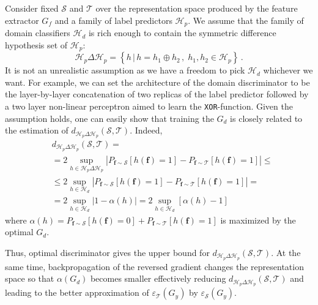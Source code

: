 Consider fixed $ \mathcal{S} $ and $ \mathcal{T} $ over the representation space produced by the feature extractor $ G_f $ and a family of label predictors $ \mathcal{H}_p $. We assume that the family of domain classifiers $ \mathcal{H}_d $ is rich enough to contain the symmetric difference hypothesis set of $ \mathcal{H}_p $:
\begin{equation}
  \mathcal{H}_p \Delta \mathcal{H}_p = \left\{ h \, | \, h = h_1 \oplus h_2 \, , \; h_1, h_2 \in \mathcal {H}_p \right\} \, .
\end{equation}
It is not an unrealistic assumption as we have a freedom to pick $ \mathcal{H}_d $ whichever we want. For example, we can set the architecture of the domain discriminator to be the layer-by-layer concatenation of two replicas of the label predictor followed by a two layer non-linear perceptron aimed to learn the \texttt{XOR}-function. Given the assumption holds, one can easily show that training the $ G_d $ is closely related to the estimation of $ d_{\mathcal{H}_p \Delta \mathcal{H}_p} (\mathcal{S}, \mathcal{T}) $. Indeed, 
\begin{equation}
\begin{split}
  &d_{\mathcal{H}_p \Delta \mathcal{H}_p}  (\mathcal{S}, \mathcal{T}) =\\ 
  & = 2 \sup_{h \in \mathcal{H}_p \Delta \mathcal{H}_p} \left| P_{\mathbf{f} \sim \mathcal{S}} [h(\mathbf{f}) = 1] - P_{\mathbf{f} \sim \mathcal{T}} [h(\mathbf{f}) = 1] \right| \leq \\
  & \leq 2 \sup_{h \in \mathcal{H}_d} \left| P_{\mathbf{f} \sim \mathcal{S}} [h(\mathbf{f}) = 1] - P_{\mathbf{f} \sim \mathcal{T}} [h(\mathbf{f}) = 1] \right| = \\
  & = 2 \sup_{h \in \mathcal{H}_d} \left| 1 - \alpha(h) \right| = 2 \sup_{h \in \mathcal{H}_d} \left[ \alpha(h) - 1 \right]
\end{split}
\end{equation}
where $ \alpha(h) = P_{\mathbf{f} \sim \mathcal{S}} [h(\mathbf{f}) = 0] + P_{\mathbf{f} \sim \mathcal{T}} [h(\mathbf{f}) = 1] $ is maximized by the optimal $ G_d $.

Thus, optimal discriminator gives the upper bound for $ d_{\mathcal{H}_p \Delta \mathcal{H}_p}  (\mathcal{S}, \mathcal{T}) $. At the same time, backpropagation of the reversed gradient changes the representation space so that $ \alpha(G_d) $ becomes smaller effectively reducing $ d_{\mathcal{H}_p \Delta \mathcal{H}_p}  (\mathcal{S}, \mathcal{T}) $ and leading to the better approximation of $ \varepsilon_\mathcal{T}(G_y) $ by $ \varepsilon_\mathcal{S}(G_y) $.
